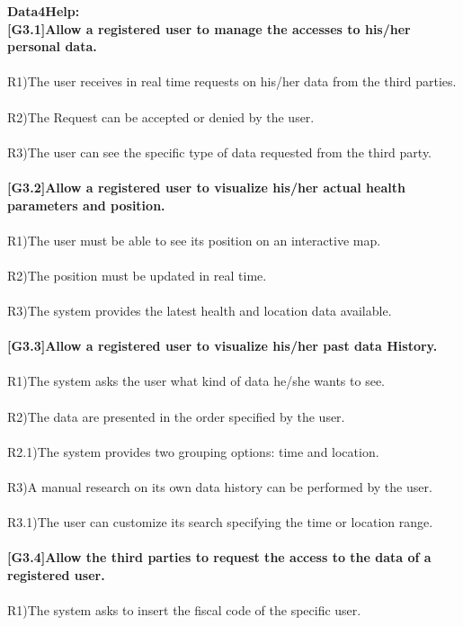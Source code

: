\textbf{Data4Help:} \\
\textbf{[G3.1]Allow a registered user to manage the accesses to his/her personal data.} \\ \\
R1)The user receives in real time requests on his/her data from the third parties. \\ \\
R2)The Request can be accepted or denied by the user.\\ \\
R3)The user can see the specific type of data requested from the third party. \\ \\ 
\textbf{ [G3.2]Allow a registered user to visualize his/her actual health parameters and position.} \\ \\
R1)The user must be able to see its position on an interactive map. \\ \\
R2)The position must be updated in real time. \\ \\
R3)The system provides the latest health and location data available. \\ \\
\textbf{[G3.3]Allow a registered user to visualize his/her past data History.} \\ \\
R1)The system asks the user what kind of data he/she wants to see. \\ \\
R2)The data are presented in the order specified by the user.  \\ \\
R2.1)The system provides two grouping options: time and location. \\ \\
R3)A manual research on its own data history can be performed by the user. \\ \\
R3.1)The user can customize its search specifying the time or location range. \\ \\ 
\textbf{[G3.4]Allow the third parties to request the access to the data of a registered user.} \\ \\
R1)The system asks to insert the fiscal code of the specific user. \\ \\
